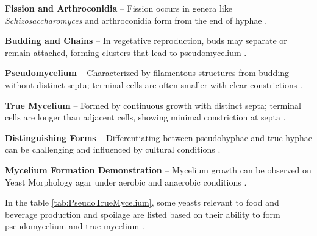 \textbf{Fission and Arthroconidia} – Fission occurs in genera like \textit{Schizosaccharomyces} and arthroconidia form from the end of hyphae \cite{L2-YeastClass}.


\textbf{Budding and Chains} – In vegetative reproduction, buds may separate or remain attached, forming clusters that lead to pseudomycelium \cite*{L2-YeastClass}.

\textbf{Pseudomycelium} – Characterized by filamentous structures from budding without distinct septa; terminal cells are often smaller with clear constrictions \cite*{L2-YeastClass}.

\textbf{True Mycelium} – Formed by continuous growth with distinct septa; terminal cells are longer than adjacent cells, showing minimal constriction at septa \cite*{L2-YeastClass}.

\textbf{Distinguishing Forms} – Differentiating between pseudohyphae and true hyphae can be challenging and influenced by cultural conditions \cite*{L2-YeastClass}.

\textbf{Mycelium Formation Demonstration} – Mycelium growth can be observed on Yeast Morphology agar under aerobic and anaerobic conditions \cite*{L2-YeastClass}.

In the table \ref*{tab:PseudoTrueMycelium}, some yeasts relevant to food and beverage production and spoilage are listed based on their ability to form pseudomycelium and true mycelium \cite*{L2-YeastClass}.

